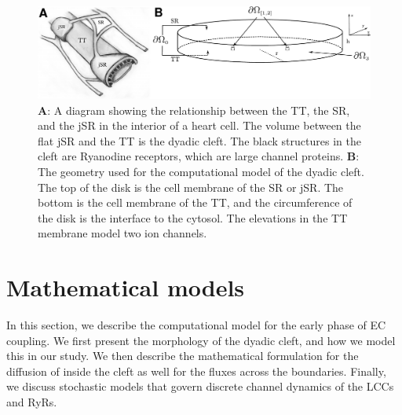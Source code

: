 \begin{figure}[t]
\label{fig:hake:morphology}
  \centering
  \includegraphics[width=\largefig]{chapters/hake/pdf/morphology}
  \caption[The dyadic cleft]{\textbf{A}: A diagram showing the
    relationship between the TT, the SR, and the jSR in the interior
    of a heart cell. The volume between the flat jSR and the TT is the
    dyadic cleft. The black structures in the cleft are Ryanodine
    receptors, which are large channel proteins. \textbf{B}: The
    geometry used for the computational model of the dyadic cleft. The
    top of the disk is the cell membrane of the SR or jSR. The bottom
    is the cell membrane of the TT, and the circumference of the disk
    is the interface to the cytosol. The elevations in the TT membrane
    model two \Ca ion channels.}
\end{figure}

\section{Mathematical models}
\label{sec:hake:mathematical-models}
In this section, we describe the computational model for the early
phase of EC coupling. We first present the morphology of the dyadic
cleft, and how we model this in our study. We then describe the
mathematical formulation for the diffusion of \Ca inside the cleft as
well for the \Ca fluxes across the boundaries. Finally, we discuss
stochastic models that govern discrete channel dynamics of the LCCs
and RyRs.\par


